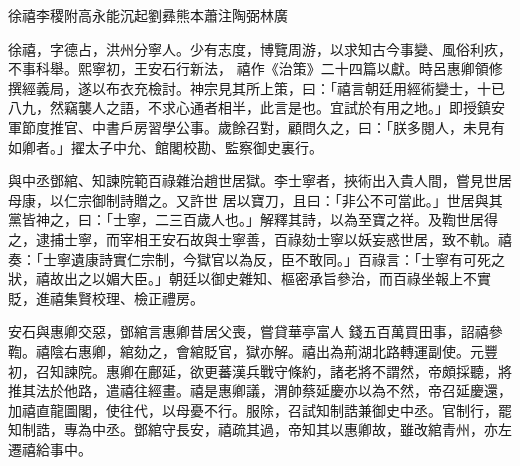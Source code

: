 
\begin{pinyinscope}

 徐禧李稷附高永能沉起劉彞熊本蕭注陶弼林廣



 徐禧，字德占，洪州分寧人。少有志度，博覽周游，以求知古今事變、風俗利疚，不事科舉。熙寧初，王安石行新法，
 禧作《治策》二十四篇以獻。時呂惠卿領修撰經義局，遂以布衣充檢討。神宗見其所上策，曰：「禧言朝廷用經術變士，十已八九，然竊襲人之語，不求心通者相半，此言是也。宜試於有用之地。」即授鎮安軍節度推官、中書戶房習學公事。歲餘召對，顧問久之，曰：「朕多閱人，未見有如卿者。」擢太子中允、館閣校勘、監察御史裏行。



 與中丞鄧綰、知諫院範百祿雜治趙世居獄。李士寧者，挾術出入貴人間，嘗見世居母康，以仁宗御制詩贈之。又許世
 居以寶刀，且曰：「非公不可當此。」世居與其黨皆神之，曰：「士寧，二三百歲人也。」解釋其詩，以為至寶之祥。及鞫世居得之，逮捕士寧，而宰相王安石故與士寧善，百祿劾士寧以妖妄惑世居，致不軌。禧奏：「士寧遺康詩實仁宗制，今獄官以為反，臣不敢同。」百祿言：「士寧有可死之狀，禧故出之以媚大臣。」朝廷以御史雜知、樞密承旨參治，而百祿坐報上不實貶，進禧集賢校理、檢正禮房。



 安石與惠卿交惡，鄧綰言惠卿昔居父喪，嘗貸華亭富人
 錢五百萬買田事，詔禧參鞫。禧陰右惠卿，綰劾之，會綰貶官，獄亦解。禧出為荊湖北路轉運副使。元豐初，召知諫院。惠卿在鄜延，欲更蕃漢兵戰守條約，諸老將不謂然，帝頗採聽，將推其法於他路，遣禧往經畫。禧是惠卿議，渭帥蔡延慶亦以為不然，帝召延慶還，加禧直龍圖閣，使往代，以母憂不行。服除，召試知制誥兼御史中丞。官制行，罷知制誥，專為中丞。鄧綰守長安，禧疏其過，帝知其以惠卿故，雖改綰青州，亦左遷禧給事中。




\end{pinyinscope}
